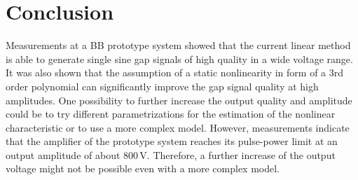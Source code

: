 \documentclass[a4paper,
               keeplastbox,%
               nospread%
              ]{jacow}
\begin{document}
	
	\section{Conclusion}
	Measurements at a BB prototype system showed that the current linear method is able to generate single sine gap signals of high quality in a wide voltage range. %
	It was also shown that the assumption of a static nonlinearity in form of a 3rd order polynomial can significantly improve the gap signal quality at high amplitudes. 
	One possibility to further increase the output quality and amplitude could be to try different parametrizations for the estimation of the nonlinear characteristic or to
	use a more complex model. However, measurements indicate that the amplifier of the prototype system reaches its pulse-power limit at an output amplitude
	of about 800\,V. Therefore, a further increase of the output voltage might not be possible even with a more complex model.

\newpage

\iffalse  %
	\newpage
	\printbibliography

\else
\end{document}
